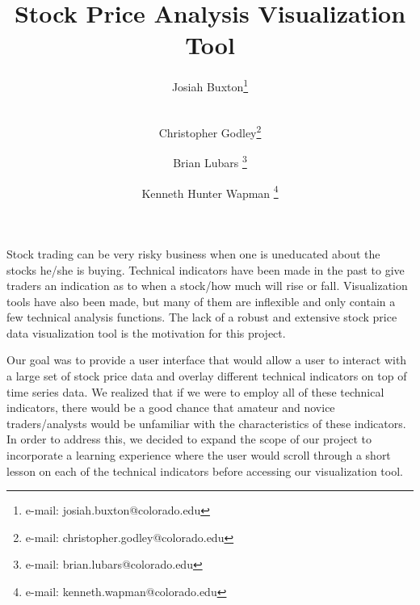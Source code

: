 \documentclass{vgtc}                          %
\title{Stock Price Analysis Visualization Tool}
\author{Josiah Buxton\thanks{e-mail: josiah.buxton@colorado.edu}\\ %
 			\\ %
\and Christopher Godley\thanks{e-mail: christopher.godley@colorado.edu}\\ %
\and Brian Lubars \thanks{e-mail: brian.lubars@colorado.edu}\\ %
%
\and Kenneth Hunter Wapman \thanks{e-mail: kenneth.wapman@colorado.edu}\\ %
}
\affiliation{\scriptsize Computer Science Department \\ University of Colorado Boulder}
\begin{document}


\maketitle

Stock trading can be very risky business when one is uneducated about the stocks he/she is buying.  Technical indicators have been made in the past to give traders an indication as to when a stock/how much will rise or fall.  Visualization tools have also been made, but many of them are inflexible and only contain a few technical analysis functions. The lack of a robust and extensive stock price data visualization tool is the motivation for this project.

Our goal was to provide a user interface that would allow a user to interact with a large set of stock price data and overlay different technical indicators on top of time series data.  We realized that if we were to employ all of these technical indicators, there would be a good chance that amateur and novice traders/analysts would be unfamiliar with the characteristics of these indicators.  In order to address this, we decided to expand the scope of our project to incorporate a learning experience where the user would scroll through a short lesson on each of the technical indicators before accessing our visualization tool.
\end{document}
